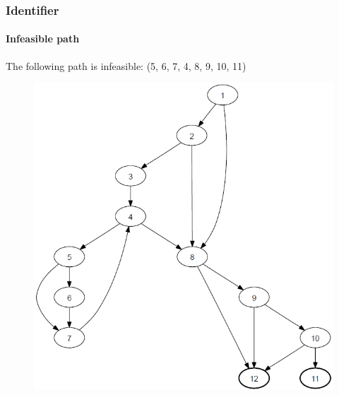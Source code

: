 \begin{frame}[hasprev=false,hasnext=false]
\frametitle{Identifier}
\framesubtitle{Infeasible path}
\label{example:identifier-infeasible-path}

The following path is infeasible: (5, 6, 7, 4, 8, 9, 10, 11)

\begin{figure}
	\centering
	\includegraphics[scale=.3]{aux/examples/identifier-infeasible-path/identifier-java-cfg}
\end{figure}
\end{frame}